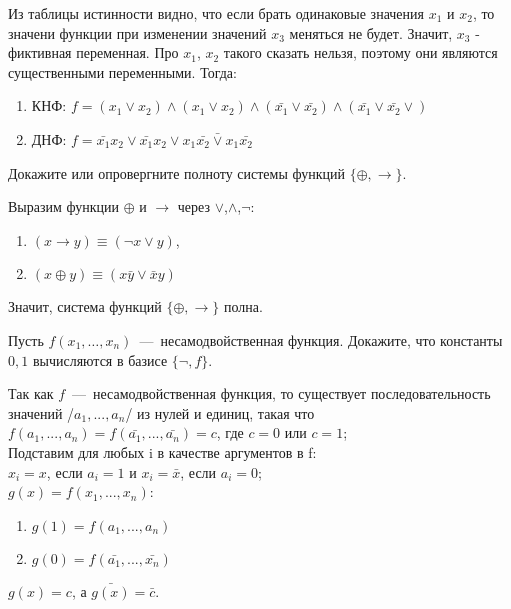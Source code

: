 \begin{solution}
\begin{enumerate}
\end{enumerate}
Из таблицы истинности видно, что если брать одинаковые значения  $x_1$ и $x_2$, то значени функции при изменении значений $x_3$ меняться не будет. Значит, $x_3$ - фиктивная переменная. Про $x_1$, $x_2$ такого сказать нельзя, поэтому они являются существенными  переменными. Тогда:
\begin{enumerate}
\item КНФ: $f=(x_1\vee x_2)\wedge(x_1\vee x_2)\wedge(\bar{x_1}\vee \bar{x_2})\wedge(\bar{x_1}\vee \bar{x_2}\vee)$
\item ДНФ: $f=\bar{x_1}x_2\vee \bar{x_1}x_2\vee x_1\bar{x_2}\bar\vee x_1\bar{x_2}$
\end{enumerate}


\end{solution}

\begin{exercise}
Докажите или опровергните полноту системы функций $\{\oplus,\to\}$.
\end{exercise}

\begin{solution}
Выразим функции $\oplus$ и $\to$ через $\vee$,$\wedge$,$\neg$:
\begin{enumerate}
\item $(x\to y)\equiv(\neg x\vee y)$,
\item $(x\oplus y)\equiv(x\bar{y}\vee \bar{x}y)$
\end{enumerate}
Значит, система функций $\{\oplus,\to\}$ полна.
\end{solution}

\begin{exercise}
Пусть $f(x_1,\ldots,x_n)$~---~несамодвойственная функция. Докажите, что
	константы $0, 1$ вычисляются в базисе $\{\neg, f\}$.
\end{exercise}

\begin{solution}
Так как $f$~---~несамодвойственная функция, то существует  последовательность значений /{$a_1,...,a_n$/} из нулей и единиц, такая что $f(a_1,...,a_n)=f(\bar{a_1},...,\bar{a_n})=c$, где $c=0$ или $c=1$;\\
Подставим для любых i в качестве аргументов в f:\\
$x_i=x$, если $a_i=1$ и $x_i=\bar{x}$, если $a_i=0$;\\
$g(x)=f(x_1,...,x_n)$:
\begin{enumerate}
\item $g(1)=f(a_1,...,a_n)$
\item $g(0)=f(\bar{a_1},...,\bar{x_n})$
\end{enumerate} 
$g(x)=c$, а $\bar{g(x)}=\bar{c}$.
\end{solution}


